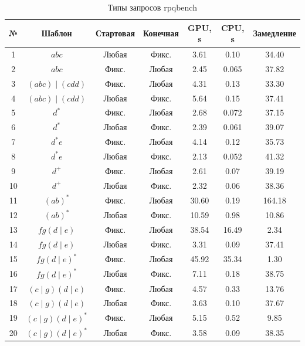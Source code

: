 \begin{table}[ht]
\centering
\caption{Типы запросов rpqbench}
\label{tab:rpqbench_types}
\begin{tabular}{|c|c|c|c|c|c|c|}
\hline
  № & Шаблон & Стартовая & Конечная & GPU, \si{\second} & CPU, \si{\second} & Замедление \\
\hline
  1  & $a b c$ & Любая & Фикс. & 3.61 & 0.10 & 34.40 \\
\hline
  2  & $a b c$ & Фикс. & Любая & 2.45 & 0.065 & 37.82 \\
\hline
  3  & $(a b c)\mid(c d d)$ & Фикс. & Любая & 4.31 & 0.13 & 33.30 \\
\hline
  4  & $(a b c)\mid(c d d)$ & Любая & Фикс. & 5.64 & 0.15 & 37.41 \\
\hline
  5  & $d^*$ & Фикс. & Любая & 2.68 & 0.072 & 37.15 \\
\hline
  6  & $d^*$ & Любая & Фикс. & 2.39 & 0.061 & 39.07 \\
\hline
  7  & $d^* e$ & Фикс. & Любая & 4.14 & 0.12 & 35.73 \\
\hline
  8  & $d^* e$ & Любая & Фикс. & 2.13 & 0.052 & 41.32 \\
\hline
  9  & $d^+$ & Фикс. & Любая & 2.61 & 0.07 & 39.19 \\
\hline
  10 & $d^+$ & Любая & Фикс. & 2.32 & 0.06 & 38.36 \\
\hline
  11 & $(a b)^*$ & Фикс. & Любая & 30.60 & 0.19 & 164.18 \\
\hline
  12 & $(a b)^*$ & Любая & Фикс. & 10.59 & 0.98 & 10.86 \\
\hline
  13 & $f g (d\mid e)$ & Фикс. & Любая & 38.54 & 16.49 & 2.34 \\
\hline
  14 & $f g (d\mid e)$ & Любая & Фикс. & 3.31 & 0.09 & 37.41 \\
\hline
  15 & $f g (d\mid e)^*$ & Фикс. & Любая & 45.92 & 35.34 & 1.30 \\
\hline
  16 & $f g (d\mid e)^*$ & Любая & Фикс. & 7.11 & 0.18 & 38.75 \\
\hline
  17 & $(c\mid g) (d\mid e)$ & Фикс. & Любая & 4.57 & 0.33 & 13.76 \\
\hline
  18 & $(c\mid g) (d\mid e)$ & Любая & Фикс. & 3.63 & 0.10 & 37.67 \\
\hline
  19 & $(c\mid g) (d\mid e)^*$ & Фикс. & Любая & 5.15 & 0.52 & 9.85 \\
\hline
  20 & $(c\mid g) (d\mid e)^*$ & Любая & Фикс. & 3.58 & 0.09 & 38.35 \\
\hline
\end{tabular}
\end{table}


